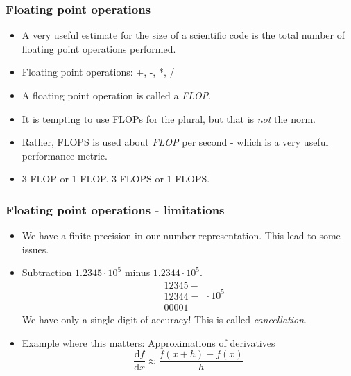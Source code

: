 \documentclass{beamer}
\begin{document}
\begin{frame}\frametitle{Floating point operations}
  \begin{itemize}
    \item A very useful estimate for the size of a scientific code is the total number of floating point operations performed.
    \item Floating point operations: +, -, *, /
    \item A floating point operation is called a \emph{FLOP}.
    \item It is tempting to use FLOPs for the plural, but that is \emph{not} the norm.
    \item Rather, FLOPS is used about \emph{FLOP} per second - which is a very useful performance metric.
    \item 3 FLOP or 1 FLOP. 3 FLOPS or 1 FLOPS.
  \end{itemize}
\end{frame}

\begin{frame}\frametitle{Floating point operations - limitations}
  \begin{itemize}
    \item We have a finite precision in our number representation. This lead to some issues.
    \item Subtraction $1.2345\cdot 10^5$ minus $1.2344\cdot 10^5$.
        \[
          \begin{split}
            & 12345 - \\
            & 12344 = \\
            & 00001
          \end{split}
          \cdot 10^5
        \] 
        We have only a single digit of accuracy! This is called \emph{cancellation}.
     \item Example where this matters: Approximations of derivatives
       \[
         \frac{\mathrm{d}f}{\mathrm{d}x} \approx \frac{f(x+h)-f(x)}{h}
       \]
  \end{itemize}
\end{frame}
\end{document}

